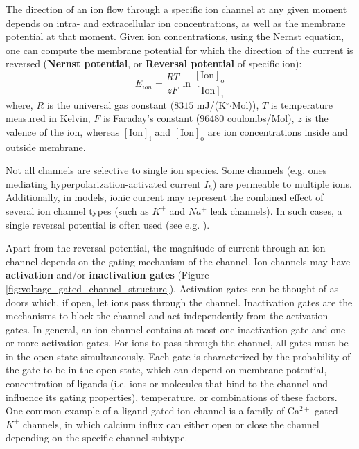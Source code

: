 \documentclass[../main.tex]{subfiles}
\begin{document}
The direction of an ion flow through a specific ion channel at any given moment depends on intra- and extracellular ion concentrations, as well as the membrane potential at that moment. Given ion concentrations, using the Nernst equation, one can compute the membrane potential for which the direction of the current is reversed \parencite{izhikevichDynamicalSystemsNeuroscience2006} (\textbf{Nernst potential}, or \textbf{Reversal potential} of specific ion):
\begin{equation}\label{eq:nernst_equation}
    E_{ion} = \frac{RT}{zF} \ln \frac{[\text{Ion}]_{\text{o}}}{[\text{Ion}]_{\text{i}}}
\end{equation}
where, $R$ is the universal gas constant ($8315$ mJ/(K$^\circ$$\cdot$Mol)), $T$ is temperature measured in Kelvin, $F$ is Faraday's constant ($96480$ coulombs/Mol), $z$ is the valence of the ion, whereas $[\text{Ion}]_{\text{i}}$ and $[\text{Ion}]_{\text{o}}$ are ion concentrations inside and outside membrane.

Not all channels are selective to single ion species. Some channels (e.g. ones mediating hyperpolarization-activated current $I_h$) are permeable to multiple ions. Additionally, in models, ionic current may represent the combined effect of several ion channel types (such as $K^+$ and $Na^+$ leak channels). In such cases, a single reversal potential is often used (see e.g. \parencite{wangMultipleDynamicalModes1994}).

Apart from the reversal potential, the magnitude of current through an ion channel depends on the gating mechanism of the channel. Ion channels may have \textbf{activation} and/or \textbf{inactivation gates} (Figure \ref{fig:voltage_gated_channel_structure}). Activation gates can be thought of as doors which, if open, let ions pass through the channel. Inactivation gates are the mechanisms to block the channel and act independently from the activation gates. In general, an ion channel contains at most one inactivation gate and one or more activation gates. For ions to pass through the channel, all gates must be in the open state simultaneously. Each gate is characterized by the probability of the gate to be in the open state, which can depend on membrane potential, concentration of ligands (i.e. ions or molecules that bind to the channel and influence its gating properties), temperature, or combinations of these factors. One common example of a ligand-gated ion channel is a family of Ca$^{2+}$ gated $K^+$ channels, in which calcium influx can either open or close the channel depending on the specific channel subtype.
\end{document}
